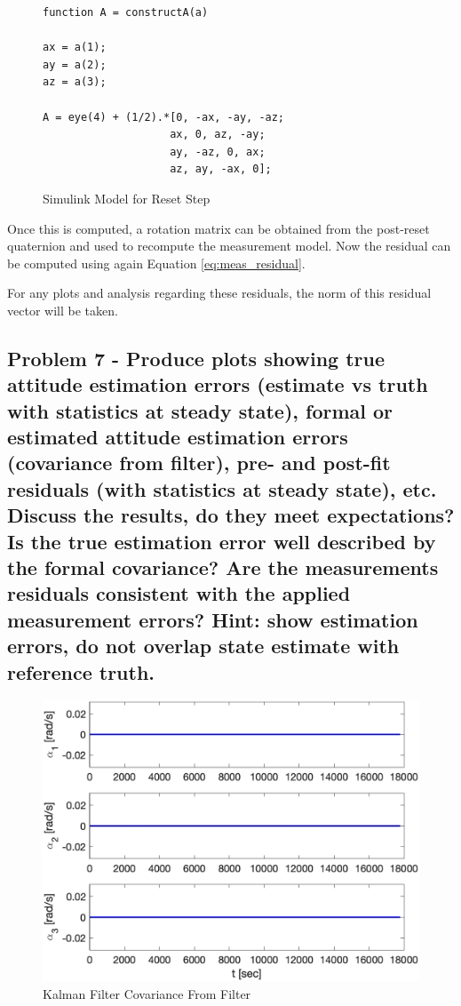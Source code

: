 \begin{figure}[H]
    \centering
    \captionsetup{ justification = centering }
    \begin{lstlisting}
function A = constructA(a)

ax = a(1);
ay = a(2);
az = a(3);

A = eye(4) + (1/2).*[0, -ax, -ay, -az;
                    ax, 0, az, -ay;
                    ay, -az, 0, ax;
                    az, ay, -ax, 0];
    \end{lstlisting}
    \caption{Simulink Model for Reset Step}
    \label{fig:quat_reset_step}
\end{figure}

Once this is computed, a rotation matrix can be obtained from the post-reset quaternion and used to recompute the measurement model. Now the residual can be computed using again Equation \ref{eq:meas_residual}.

For any plots and analysis regarding these residuals, the norm of this residual vector will be taken.

\subsection{Problem 7 - Produce plots showing true attitude estimation errors (estimate vs truth with statistics at steady state), formal or estimated attitude estimation errors (covariance from filter), pre- and post-fit residuals (with statistics at steady state), etc. Discuss the results, do they meet expectations? Is the true estimation error well described by the formal covariance? Are the measurements residuals consistent with the applied measurement errors? Hint: show estimation errors, do not overlap state estimate with reference truth.}

\begin{figure}[H]
    \centering
    \captionsetup{ justification = centering }
    \includegraphics[width = 12cm]{Images/PS8/kalman_filter_meas_update_att_cov_bounds.png}
    \caption{Kalman Filter Covariance From Filter}
    \label{fig:kalman_att_cov}
\end{figure}

